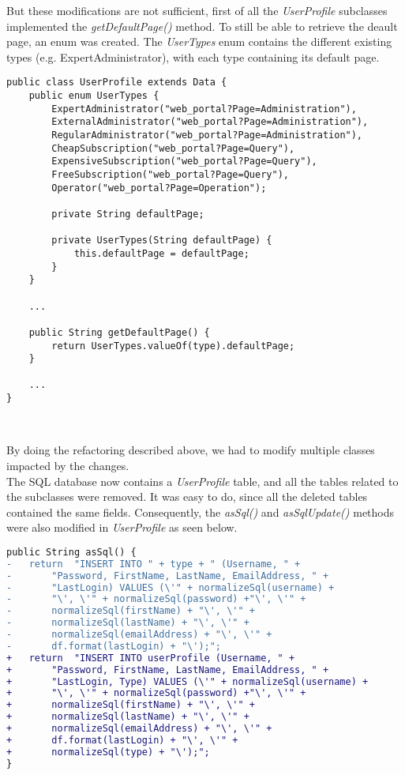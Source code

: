 But these modifications are not sufficient, first of all the
\emph{UserProfile} subclasses implemented the \emph{getDefaultPage()}
method. To still be able to retrieve the deault page, an enum was
created. The \emph{UserTypes} enum contains the different existing types
(e.g. ExpertAdministrator), with each type containing its default page.\\

\begin{lstlisting}
public class UserProfile extends Data {
    public enum UserTypes {
        ExpertAdministrator("web_portal?Page=Administration"),
        ExternalAdministrator("web_portal?Page=Administration"),
        RegularAdministrator("web_portal?Page=Administration"),
        CheapSubscription("web_portal?Page=Query"),
        ExpensiveSubscription("web_portal?Page=Query"),
        FreeSubscription("web_portal?Page=Query"),
        Operator("web_portal?Page=Operation");
        
        private String defaultPage;
 
        private UserTypes(String defaultPage) {
            this.defaultPage = defaultPage;
        }
    }
    
    ...
    
    public String getDefaultPage() {
        return UserTypes.valueOf(type).defaultPage;
    }
    
    ...
}
\end{lstlisting}
\

By doing the refactoring described above, we had to modify multiple classes
impacted by the changes.\\

The SQL database now contains a \emph{UserProfile} table, and all the tables
related to the subclasses were removed. It was easy to do, since all the
deleted tables contained the same fields. Consequently, the \emph{asSql()}
and \emph{asSqlUpdate()} methods were also modified in \emph{UserProfile} as
seen below.\\

\begin{lstlisting}[language=diff]
public String asSql() {
-   return  "INSERT INTO " + type + " (Username, " +
-       "Password, FirstName, LastName, EmailAddress, " +
-       "LastLogin) VALUES (\'" + normalizeSql(username) +
-       "\', \'" + normalizeSql(password) +"\', \'" +
-       normalizeSql(firstName) + "\', \'" +
-       normalizeSql(lastName) + "\', \'" +
-       normalizeSql(emailAddress) + "\', \'" +
-       df.format(lastLogin) + "\');";
+   return  "INSERT INTO userProfile (Username, " +
+       "Password, FirstName, LastName, EmailAddress, " +
+       "LastLogin, Type) VALUES (\'" + normalizeSql(username) +
+       "\', \'" + normalizeSql(password) +"\', \'" +
+       normalizeSql(firstName) + "\', \'" +
+       normalizeSql(lastName) + "\', \'" +
+       normalizeSql(emailAddress) + "\', \'" +
+       df.format(lastLogin) + "\', \'" +
+       normalizeSql(type) + "\');";
}
\end{lstlisting}
\

